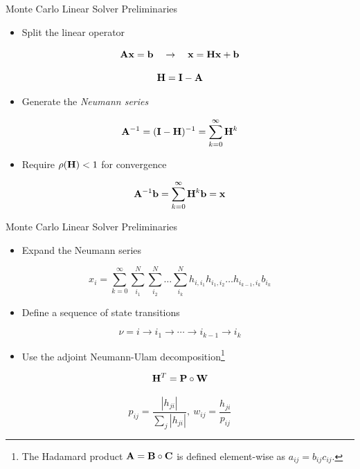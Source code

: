 \documentclass{beamer}
\begin{document}
\begin{frame}{Monte Carlo Linear Solver Preliminaries}

  \begin{itemize}
  \item Split the linear operator
  \end{itemize}

  \[
  \mathbf{A}\mathbf{x} = \mathbf{b} \ \ \ \rightarrow \ \ \ \mathbf{x} = \mathbf{H} \mathbf{x}
  + \mathbf{b}
  \]

  \[
  \mathbf{H} = \mathbf{I} - \mathbf{A}
  \]

  \medskip
  \begin{itemize}
  \item Generate the \textit{Neumann series}
  \end{itemize}
  
  \[
  \mathbf{A}^{-1} = (\mathbf{I}-\mathbf{H})^{-1} = \sum_{k=0}^{\infty} \mathbf{H}^k
  \]

  \medskip
  \begin{itemize}
  \item Require $\rho(\mathbf{H}) < 1$ for convergence
  \end{itemize}

  \[
  \mathbf{A}^{-1}\mathbf{b} = \sum_{k=0}^{\infty} \mathbf{H}^k\mathbf{b} = \mathbf{x}
  \]

\end{frame}

\begin{frame}{Monte Carlo Linear Solver Preliminaries}

  \begin{itemize}
  \item Expand the Neumann series
  \end{itemize}

  \[
  x_i = \sum_{k=0}^{\infty}\sum_{i_1}^{N}\sum_{i_2}^{N}\ldots
  \sum_{i_k}^{N}h_{i,i_1}h_{i_1,i_2}\ldots h_{i_{k-1},i_k}b_{i_k}
  \]

  \begin{itemize}
  \item Define a sequence of state transitions
  \end{itemize}
  
  \[
  \nu = i \rightarrow i_1 \rightarrow \cdots \rightarrow i_{k-1}
  \rightarrow i_{k}
  \]

  \begin{itemize}
  \item Use the adjoint Neumann-Ulam
    decomposition\let\thefootnote\relax\footnote{The Hadamard product
      $\mathbf{A} = \mathbf{B} \circ \mathbf{C}$ is defined element-wise as
      $a_{ij} = b_{ij} c_{ij}$.}
  \end{itemize}

  \[
  \mathbf{H}^{T} = \mathbf{P} \circ \mathbf{W}
  \]

  \[
  p_{ij} = \frac{|h_{ji}|}{\sum_j |h_{ji}|},\ w_{ij} =
  \frac{h_{ji}}{p_{ij}}
  \]

\end{frame}
\end{document}
